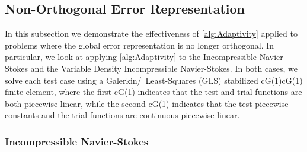 \subsection{Non-Orthogonal Error Representation}

In this subsection we demonstrate the effectiveness of \autoref{alg:Adaptivity}
applied to problems where the global error representation is no longer
orthogonal. In particular, we look at applying \autoref{alg:Adaptivity} to the
Incompressible Navier-Stokes and the Variable Density Incompressible
Navier-Stokes. In both cases, we solve each test case using a
Galerkin\slash~Least-Squares (GLS) stabilized cG(1)cG(1) finite element, where
the first cG(1) indicates that the test and trial functions are both piecewise
linear, while the second cG(1) indicates that the test piecewise constants and
the trial functions are continuous piecewise linear.

\subsubsection{Incompressible Navier-Stokes}

